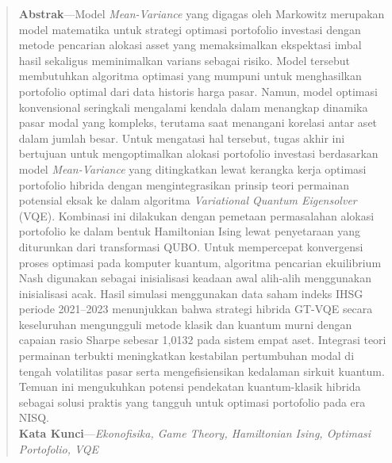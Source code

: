 \begin{quote}
\noindent\textbf{Abstrak}---Model \textit{Mean-Variance} yang digagas oleh Markowitz merupakan model matematika untuk strategi optimasi portofolio investasi dengan metode pencarian alokasi asset yang memaksimalkan ekspektasi imbal hasil sekaligus meminimalkan varians sebagai risiko. Model tersebut membutuhkan algoritma optimasi yang mumpuni untuk menghasilkan portofolio optimal dari data historis harga pasar. Namun, model optimasi konvensional seringkali mengalami kendala dalam menangkap dinamika pasar modal yang kompleks, terutama saat menangani korelasi antar aset dalam jumlah besar. Untuk mengatasi hal tersebut, tugas akhir ini bertujuan untuk mengoptimalkan alokasi portofolio investasi berdasarkan model \textit{Mean-Variance} yang ditingkatkan lewat kerangka kerja optimasi portofolio hibrida dengan mengintegrasikan prinsip teori permainan potensial eksak ke dalam algoritma \textit{Variational Quantum Eigensolver} (VQE). Kombinasi ini dilakukan dengan pemetaan permasalahan alokasi portofolio ke dalam bentuk Hamiltonian Ising lewat penyetaraan yang diturunkan dari transformasi QUBO. Untuk mempercepat konvergensi proses optimasi pada komputer kuantum, algoritma pencarian ekuilibrium Nash digunakan sebagai inisialisasi keadaan awal alih-alih menggunakan inisialisasi acak. Hasil simulasi menggunakan data saham indeks IHSG periode 2021--2023 menunjukkan bahwa strategi hibrida GT-VQE secara keseluruhan mengungguli metode klasik dan kuantum murni dengan capaian rasio Sharpe sebesar 1,0132 pada sistem empat aset. Integrasi teori permainan terbukti meningkatkan kestabilan pertumbuhan modal di tengah volatilitas pasar serta mengefisiensikan kedalaman sirkuit kuantum. Temuan ini mengukuhkan potensi pendekatan kuantum-klasik hibrida sebagai solusi praktis yang tangguh untuk optimasi portofolio pada era NISQ. \\

\noindent\textbf{Kata Kunci}---\textit{Ekonofisika, Game Theory, Hamiltonian Ising, Optimasi Portofolio, VQE}
\end{quote}
